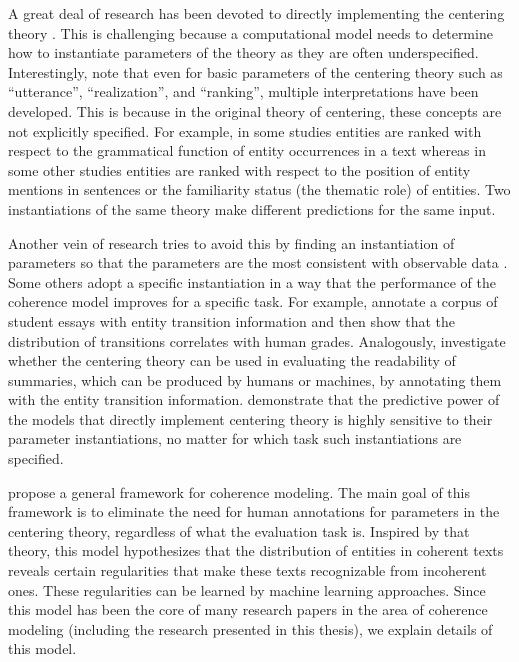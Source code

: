 A great deal of research has been devoted to directly implementing the centering theory \cite{miltsakaki00,karamanis04a}. 
This is challenging because a computational model needs to determine how to instantiate parameters of the theory as they are often underspecified. 
Interestingly,  note that even for basic parameters of the centering theory such as ``utterance'', ``realization'', and ``ranking'', multiple interpretations have been developed.
This is because in the original theory of centering, these concepts are not explicitly specified. 
For example, in some studies entities are ranked with respect to the grammatical function of entity occurrences in a text \cite{brennan87,grosz95} whereas in some other studies entities are ranked with respect to the position of entity mentions in sentences \cite{prince81a} or the familiarity status (the thematic role) \cite{strube.cl99,moens08} of entities.  
Two instantiations of the same theory make different predictions for the same input. 

Another vein of research tries to avoid this by finding an instantiation of parameters so that the parameters are the most consistent with observable data \cite{strube.cl99,karamanis04a,poesio04b}. 
Some others adopt a specific instantiation in a way that the performance of the coherence model improves for a specific task. 
For example,  annotate a corpus of student essays with entity transition information and then show that the distribution of transitions correlates with human grades. 
Analogously,  investigate whether the centering theory can be used in evaluating the readability of summaries, which can be produced by humans or machines, by annotating them with the entity transition information. 
 demonstrate that the predictive power of the models that directly implement centering theory is highly sensitive to their parameter instantiations, no matter for which task such instantiations are specified. 

 propose a general framework for coherence modeling.  
The main goal of this framework is to eliminate the need for human annotations for parameters in the centering theory, regardless of what the evaluation task is. 
Inspired by that theory, this model hypothesizes that the distribution of entities in coherent texts reveals certain regularities that make these texts recognizable from incoherent ones. 
These regularities can be learned by machine learning approaches.  
Since this model has been the core of many research papers in the area of coherence modeling (including the research presented in this thesis), we explain details of this model.    

